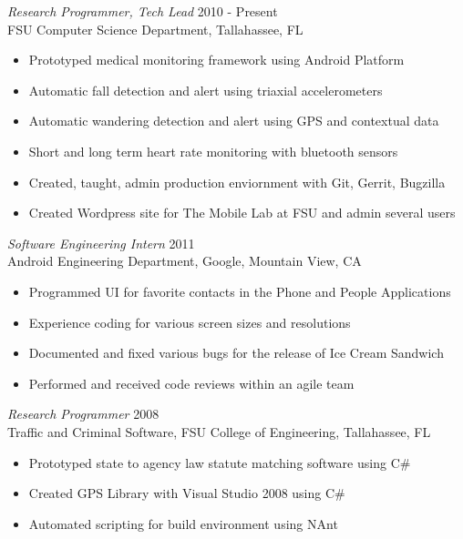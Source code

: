 \documentclass[margin]{res}
\begin{document}
\begin{resume}
{\sl Research Programmer, Tech Lead} \hfill            2010 - Present\\
FSU Computer Science Department, Tallahassee, FL
\begin{itemize}  \itemsep -5pt %
\item Prototyped medical monitoring framework using Android Platform
\item Automatic fall detection and alert using triaxial accelerometers
\item Automatic wandering detection and alert using GPS and contextual data
\item Short and long term heart rate monitoring with bluetooth sensors
\item Created, taught, admin production enviornment with Git, Gerrit, Bugzilla
\item Created Wordpress site for The Mobile Lab at FSU and admin several users
\end{itemize} 

{\sl Software Engineering Intern} \hfill     2011 \\
Android Engineering Department, Google, Mountain View, CA
\begin{itemize} \itemsep -5pt
\item Programmed UI for favorite contacts in the Phone and People Applications
\item Experience coding for various screen sizes and resolutions 
\item Documented and fixed various bugs for the release of Ice Cream Sandwich
\item Performed and received code reviews within an agile team
\end{itemize}

{\sl Research Programmer} \hfill            2008 \\
Traffic and Criminal Software, FSU College of Engineering, Tallahassee, FL
\begin{itemize}  \itemsep -5pt %
\item Prototyped state to agency law statute matching software using C\#
\item Created GPS Library with Visual Studio 2008 using C\#
\item Automated scripting for build environment using NAnt
\end{itemize} 


\end{resume}
\end{document}
